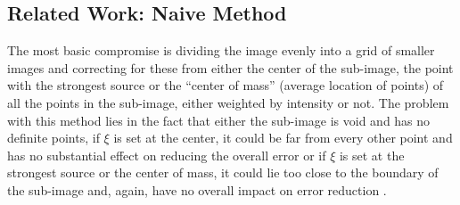 \subsection{Related Work: Naive Method}
The most basic compromise is dividing the image evenly into a grid of smaller images and correcting for these from either the center of the sub-image, the point with the strongest source or the ``center of mass'' (average location of points) of all the points in the sub-image, either weighted by intensity or not. The problem with this method lies in the fact that either the sub-image is void and has no definite points, if $\xi$ is set at the center, it could be far from every other point and has no substantial effect on reducing the overall error or if $\xi$ is set at the strongest source or the center of mass, it could lie too close to the boundary of the sub-image and, again, have no overall impact on error reduction \cite{oleg}.



